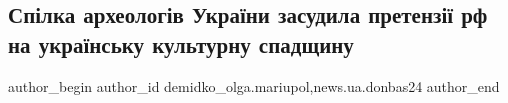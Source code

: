  
 
 
 
 
 
\subsection{Спілка археологів України засудила претензії рф на українську культурну спадщину}
\label{sec:06_10_2022.stz.news.ua.donbas24.1.spilka_arheologiv_ukr_zasudyla_pretenzii_rf}
 
\ifcmt
 author_begin
   author_id demidko_olga.mariupol,news.ua.donbas24
 author_end
\fi
